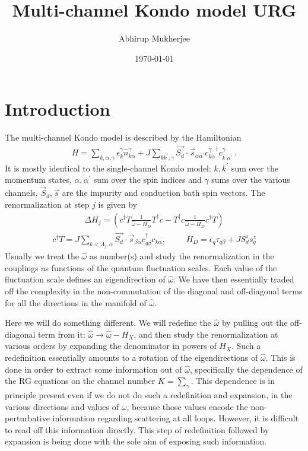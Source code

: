 \documentclass{revtex4-2}
\numberwithin{equation}{section}
\begin{document}
\title{Multi-channel Kondo model URG}
\author{Abhirup Mukherjee}
\date{\today}
\maketitle
\section{Introduction}
The multi-channel Kondo model is described by the Hamiltonian
\begin{equation}\begin{aligned}
	H = \sum_{k,\alpha,\gamma}\epsilon_{k}^\gamma \hat n^\gamma_{k\alpha} + J\sum_{kk^\prime,\gamma} \vec{S_d}\cdot\vec{s}_{\alpha\alpha^\prime}{c^\gamma_{k\alpha}}^\dagger c^\gamma_{k^\prime\alpha^\prime}~.
\end{aligned}\end{equation}
It is mostly identical to the single-channel Kondo model: \(k,k^\prime\) sum over the momentum states, \(\alpha,\alpha^\prime\) sum over the spin indices and \(\gamma\) sums over the various channels. \(\vec S_d, \vec s\) are the impurity and conduction bath spin vectors. The renormalization at step \(j\) is given by
\begin{equation}\begin{aligned}
	\Delta H_j = \left(c^\dagger T \frac{1}{\hat \omega - H_D}T^\dagger c - T^\dagger c \frac{1}{\hat \omega - H_D}c^\dagger T\right)
\end{aligned}\end{equation}
\begin{equation}\begin{aligned}
	c^\dagger T = J \sum_{k < \Lambda_j, \alpha}\vec{S_d}\cdot\vec{s}_{\beta \alpha}c^\dagger_{q\beta}c_{k\alpha}, &&&H_D = \epsilon_q \tau_{q\beta} + J S_d^z s_q^z
\end{aligned}\end{equation}
Usually we treat the \(\hat \omega\) as number(s) and study the renormalization in the couplings as functions of the quantum fluctuation scales. Each value of the fluctuation scale defines an eigendirection of \(\hat \omega\). We have then essentially traded off the complexity in the non-commutation of the diagonal and off-diagonal terms for all the directions in the manifold of \(\hat \omega\).

Here we will do something different. We will redefine the \(\hat \omega\) by pulling out the off-diagonal term from it: \(\hat \omega \to \hat \omega - H_X\), and then study the renormalization at various orders by expanding the denominator in powers of \(H_X\). Such a redefinition essentially amounts to a rotation of the eigendirections of \(\hat \omega\). This is done in order to extract some information out of \(\hat \omega\), specifically the dependence of the RG equations on the channel number \(K = \sum_\gamma\). This dependence is in principle present even if we do not do such a redefinition and expansion, in the various directions and values of \(\omega\), because those values encode the non-perturbative information regarding scattering at all loops. However, it is difficult to read off this information directly. This step of redefinition followed by expansion is being done with the sole aim of exposing such information. 
\end{document}
